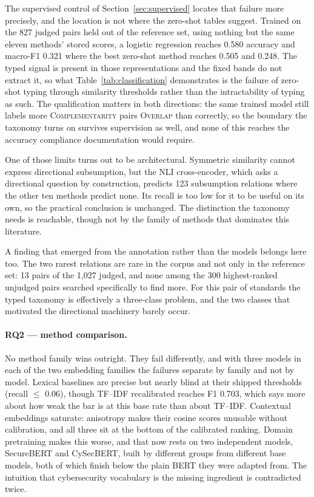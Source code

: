The supervised control of Section~\ref{sec:supervised} locates that failure more
precisely, and the location is not where the zero-shot tables suggest. Trained on
the 827 judged pairs held out of the reference set, using nothing but the same
eleven methods' stored scores, a logistic regression reaches 0.580 accuracy and
macro-F1 0.321 where the best zero-shot method reaches 0.505 and 0.248. The typed
signal is present in those representations and the fixed bands do not extract it,
so what Table~\ref{tab:classification} demonstrates is the failure of zero-shot
typing through similarity thresholds rather than the intractability of typing as
such. The qualification matters in both directions: the same trained model still
labels more \textsc{Complementarity} pairs \textsc{Overlap} than correctly, so the
boundary the taxonomy turns on survives supervision as well, and none of this
reaches the accuracy compliance documentation would require.

One of those limits turns out to be architectural. Symmetric similarity cannot
express directional subsumption, but the NLI cross-encoder, which asks a
directional question by construction, predicts 123 subsumption relations where
the other ten methods predict none. Its recall is too low for it to be useful on
its own, so the practical conclusion is unchanged. The distinction the taxonomy
needs is reachable, though not by the family of methods that dominates this
literature.

A finding that emerged from the annotation rather than the models belongs here
too. The two rarest relations are rare in the corpus and not only in the
reference set: 13 pairs of the 1{,}027 judged, and none among the 300
highest-ranked unjudged pairs searched specifically to find more. For this pair
of standards the typed taxonomy is effectively a three-class problem, and the two
classes that motivated the directional machinery barely occur.

\paragraph{RQ2 --- method comparison.}
No method family wins outright. They fail differently, and with three models in
each of the two embedding families the failures separate by family and not by
model. Lexical baselines are precise but nearly blind at their shipped thresholds
(recall $\leq$ 0.06), though TF--IDF recalibrated reaches F1 0.703, which says
more about how weak the bar is at this base rate than about TF--IDF. Contextual
embeddings saturate: anisotropy makes their cosine scores unusable without
calibration, and all three sit at the bottom of the calibrated ranking. Domain
pretraining makes this worse, and that now rests on two independent models,
SecureBERT and CySecBERT, built by different groups from different base models,
both of which finish below the plain BERT they were adapted from. The intuition
that cybersecurity vocabulary is the missing ingredient is contradicted twice.

